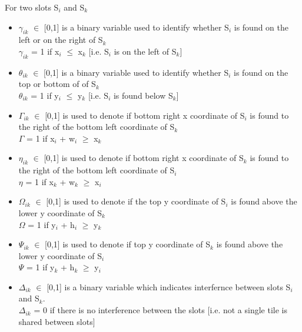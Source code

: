 \documentclass[conference]{IEEEtran}
\begin{document}
For two slots S$_i$ and S$_k$ 
\begin{itemize}
\item $\gamma_{ik}$ $\in$ [0,1] is a binary variable used to identify whether S$_i$ is found on the left or on the right of S$_k$\\
$\gamma_{ik}$ = 1 if x$_i$ $\leq$ x$_k$ [i.e. S$_i$ is on the left of S$_k$]

\item $\theta_{ik}$ $\in$ [0,1] is a binary variable used to identify whether S$_i$ is found on the top or bottom of of S$_k$\\
$\theta_{ik}$ = 1 if y$_i$ $\leq$ y$_k$ [i.e. S$_i$ is found below S$_k$]

\item $\Gamma_{ik}$ $\in$ [0,1] is used to denote if bottom right x coordinate of S$_i$ is found to the right of the bottom left coordinate of S$_k$ \\
$\Gamma$ = 1 if x$_i$ + w$_i$ $\geq$ x$_k$

\item $\eta_{ik}$ $\in$ [0,1] is used to denote if bottom right x coordinate of S$_k$ is found to the right of the bottom left coordinate of S$_i$ \\
$\eta$ = 1 if x$_k$ + w$_k$ $\geq$ x$_i$

\item $\Omega_{ik}$ $\in$ [0,1] is used to denote if the top y coordinate of S$_i$ is found above the lower y coordinate of S$_k$ \\
$\Omega$ = 1 if y$_i$ + h$_i$ $\geq$ y$_k$

\item $\Psi_{ik}$ $\in$ [0,1] is used to denote if top y coordinate of S$_k$ is found above the lower y coordinate of S$_i$ \\
$\Psi$ = 1 if y$_k$ + h$_k$ $\geq$ y$_i$


\item $\Delta_{ik}$ $\in$ [0,1] is a binary variable which indicates interfernce between slots S$_i$ and S$_k$.\\
$\Delta_{ik}$ = 0 if there is no interference between the slots [i.e. not a single tile is shared between slots]


\end{itemize}
\end{document}
